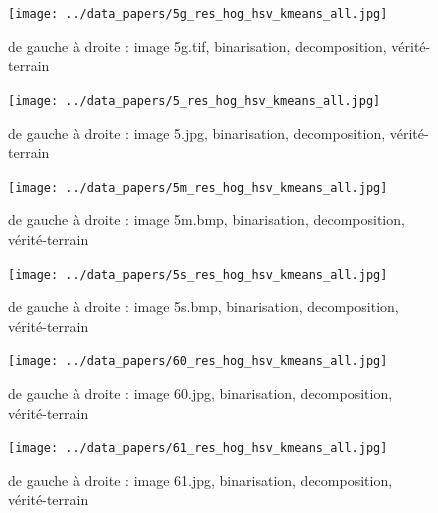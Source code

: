 \documentclass{book}
\begin{document}
\begin{figure}[H]
\begin{center}
\texttt{[image: ../data\_papers/5g\_res\_hog\_hsv\_kmeans\_all.jpg]}
\end{center}
\caption{de gauche à droite : image 5g.tif, binarisation, decomposition, vérité-terrain}
\label{5g}
\end{figure}
\clearpage


\begin{figure}[H]
\begin{center}
\texttt{[image: ../data\_papers/5\_res\_hog\_hsv\_kmeans\_all.jpg]}
\end{center}
\caption{de gauche à droite : image 5.jpg, binarisation, decomposition, vérité-terrain}
\label{5}
\end{figure}
\clearpage


\begin{figure}[H]
\begin{center}
\texttt{[image: ../data\_papers/5m\_res\_hog\_hsv\_kmeans\_all.jpg]}
\end{center}
\caption{de gauche à droite : image 5m.bmp, binarisation, decomposition, vérité-terrain}
\label{5m}
\end{figure}
\clearpage


\begin{figure}[H]
\begin{center}
\texttt{[image: ../data\_papers/5s\_res\_hog\_hsv\_kmeans\_all.jpg]}
\end{center}
\caption{de gauche à droite : image 5s.bmp, binarisation, decomposition, vérité-terrain}
\label{5s}
\end{figure}
\clearpage


\begin{figure}[H]
\begin{center}
\texttt{[image: ../data\_papers/60\_res\_hog\_hsv\_kmeans\_all.jpg]}
\end{center}
\caption{de gauche à droite : image 60.jpg, binarisation, decomposition, vérité-terrain}
\label{60}
\end{figure}
\clearpage


\begin{figure}[H]
\begin{center}
\texttt{[image: ../data\_papers/61\_res\_hog\_hsv\_kmeans\_all.jpg]}
\end{center}
\caption{de gauche à droite : image 61.jpg, binarisation, decomposition, vérité-terrain}
\label{61}
\end{figure}
\clearpage
\end{document}
